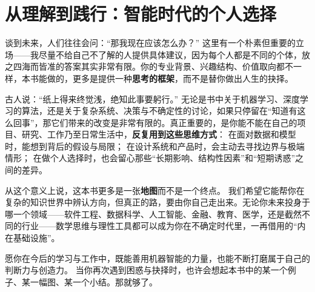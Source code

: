 \section*{从理解到践行：智能时代的个人选择}

谈到未来，人们往往会问：“那我现在应该怎么办？”  
这里有一个朴素但重要的立场——我尽量不给自己不了解的人提供具体建议，因为每个人都是不同的个体，放之四海而皆准的答案其实非常有限。你的专业背景、兴趣结构、价值取向都不一样，本书能做的，更多是提供一种\textbf{思考的框架}，而不是替你做出人生的抉择。

古人说：“纸上得来终觉浅，绝知此事要躬行。”  
无论是书中关于机器学习、深度学习的算法，还是关于复杂系统、决策与不确定性的讨论，如果只停留在“知道有这么回事”，那它们带来的改变是非常有限的。真正重要的，是你能不能在自己的项目、研究、工作乃至日常生活中，\textbf{反复用到这些思维方式}：  
在面对数据和模型时，能想到背后的假设与局限；  
在设计系统和产品时，会主动去寻找边界与极端情形；  
在做个人选择时，也会留心那些“长期影响、结构性因素”和“短期诱惑”之间的差异。

从这个意义上说，这本书更多是一张\textbf{地图}而不是一个终点。  
我们希望它能帮你在复杂的知识世界中辨认方向，但真正的路，要由你自己走出来。无论你未来投身于哪一个领域——软件工程、数据科学、人工智能、金融、教育、医学，还是截然不同的行业——数学思维与理性工具都可以成为你在不确定时代里，一再借用的“内在基础设施”。

愿你在今后的学习与工作中，既能善用机器智能的力量，也能不断打磨属于自己的判断力与创造力。  
当你再次遇到困惑与抉择时，也许会想起本书中的某一个例子、某一幅图、某一个小结。那就够了。

\newpage
\nocite{*}

